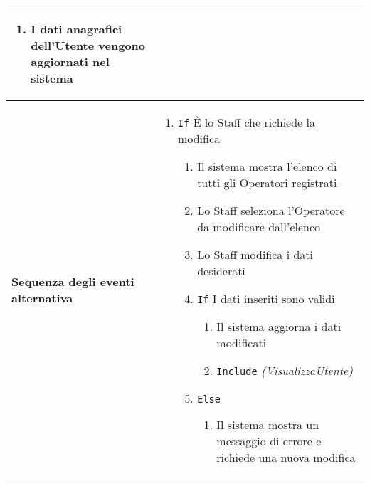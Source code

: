 \documentclass[a4paper]{report}
\begin{document}
\begin{table}[H]
\begin{tabular}{|p{3.9cm}|p{9.9cm}|}
\begin{enumerate}[leftmargin=14pt,label=\arabic*.,labelsep=0.5em,topsep=0pt,partopsep=0pt,parsep=0pt,itemsep=0pt]
    \item I dati anagrafici dell’Utente vengono aggiornati nel sistema
    \end{enumerate} \\ \hline
\textbf{Sequenza degli eventi alternativa} & \begin{enumerate}[leftmargin=14pt,label=\arabic*.,labelsep=0.5em,topsep=0pt,partopsep=0pt,parsep=0pt,itemsep=0pt] 
    \item \texttt{If} È lo Staff che richiede la modifica
    \begin{enumerate}[label=\arabic{enumi}.\arabic*.,leftmargin=22pt,labelsep=0.5em,topsep=0pt,partopsep=0pt,parsep=0pt,itemsep=0pt]
    \item Il sistema mostra l'elenco di tutti gli Operatori registrati
    \item Lo Staff seleziona l'Operatore da modificare dall'elenco
    \item Lo Staff modifica i dati desiderati
    \item \texttt{If} I dati inseriti sono validi
    \begin{enumerate}[label=\arabic{enumi}.\arabic{enumii}.\arabic*.,leftmargin=22pt,labelsep=0.5em,topsep=0pt,partopsep=0pt,parsep=0pt,itemsep=0pt]
        \item Il sistema aggiorna i dati modificati
        \item \texttt{Include} \textit{(VisualizzaUtente)} 
        \end{enumerate}
    \item \texttt{Else}
    \begin{enumerate}[label=\arabic{enumi}.\arabic{enumii}.\arabic*.,leftmargin=22pt,labelsep=0.5em,topsep=0pt,partopsep=0pt,parsep=0pt,itemsep=0pt]
        \item Il sistema mostra un messaggio di errore e richiede una nuova modifica
        \end{enumerate}
    \end{enumerate}
\end{enumerate}\\ \hline
\end{tabular}
\end{table}
\end{document}
